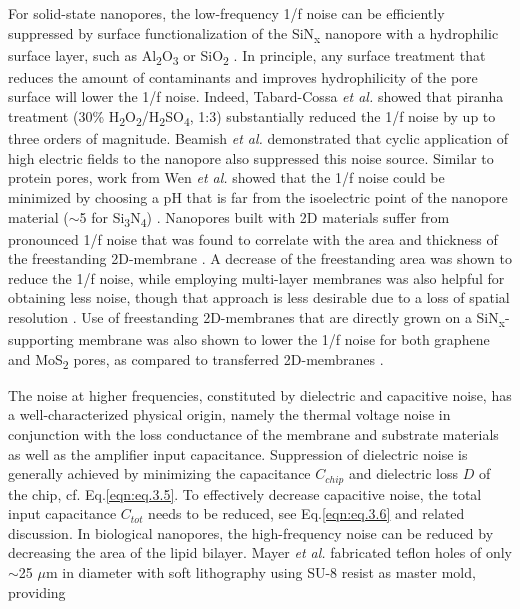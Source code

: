 For solid-state nanopores, the low-frequency 1/f noise can be efficiently suppressed by surface functionalization of the SiN\textsubscript{x} nanopore with a hydrophilic surface layer, such as Al\textsubscript{2}O\textsubscript{3} or SiO\textsubscript{2} \cite{Wang2013,Nilsson2006,Danelon2006,Chen2004}. In principle, any surface treatment that reduces the amount of contaminants and improves hydrophilicity of the pore surface will lower the 1/f noise. Indeed, Tabard-Cossa \emph{et al.} \cite{Tabard-Cossa2007} showed that piranha treatment (30\% H\textsubscript{2}O\textsubscript{2}/H\textsubscript{2}SO\textsubscript{4}, 1:3) substantially reduced the 1/f noise by up to three orders of magnitude. Beamish \emph{et al.} \cite{Beamish2012} demonstrated that cyclic application of high electric fields to the nanopore also suppressed this noise source. Similar to protein pores, work from Wen \emph{et al.} \cite{Wen2017} showed that the 1/f noise could be minimized by choosing a pH that is far from the isoelectric point of the nanopore material ($\sim$5 for Si\textsubscript{3}N\textsubscript{4}) \cite{Kosmulski2002,Firnkes2010}. Nanopores built with 2D materials suffer from pronounced 1/f noise that was found to correlate with the area and thickness of the freestanding 2D-membrane \cite{Montal1972,Sakmann2009}. A decrease of the freestanding area was shown to reduce the 1/f noise, while employing multi-layer membranes was also helpful for obtaining less noise, though that approach is less desirable due to a loss of spatial resolution \cite{Park2016,Heerema2015,Zhang2018}. Use of freestanding 2D-membranes that are directly grown on a SiN\textsubscript{x}-supporting membrane was also shown to lower the 1/f noise for both graphene \cite{Waduge2015a} and MoS\textsubscript{2} \cite{Waduge2015} pores, as compared to transferred 2D-membranes \cite{Merchant2010,Heerema2015}.


The noise at higher frequencies, constituted by dielectric and capacitive noise, has a well-characterized physical origin, namely the thermal voltage noise in conjunction with the loss conductance of the membrane and substrate materials as well as the amplifier input capacitance. Suppression of dielectric noise is generally achieved by minimizing the capacitance $C_{chip}$ and dielectric loss $D$ of the chip, cf. Eq.\ref{eqn:eq.3.5}. To effectively decrease capacitive noise, the total input capacitance $C_{tot}$ needs to be reduced, see Eq.\ref{eqn:eq.3.6} and related discussion. In biological nanopores, the high-frequency noise can be reduced by decreasing the area of the lipid bilayer. Mayer \emph{et al.}\cite{Mayer2003} fabricated teflon holes of only $\sim$25 $\mu$m in diameter with soft lithography using SU-8 resist as master mold, providing 

